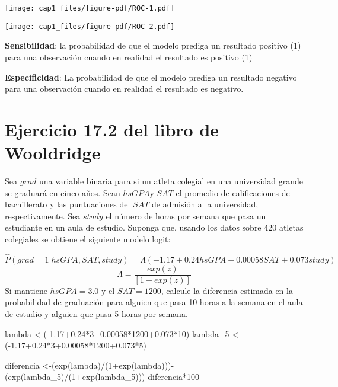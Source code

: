 \documentclass[
  letterpaper,
  DIV=11,
  numbers=noendperiod]{scrreprt}
\newenvironment{Shaded}{\begin{snugshade}}{\end{snugshade}}
\newcommand{\DecValTok}[1]{\textcolor[rgb]{0.68,0.00,0.00}{#1}}
\newcommand{\FloatTok}[1]{\textcolor[rgb]{0.68,0.00,0.00}{#1}}
\newcommand{\FunctionTok}[1]{\textcolor[rgb]{0.28,0.35,0.67}{#1}}
\newcommand{\NormalTok}[1]{\textcolor[rgb]{0.00,0.23,0.31}{#1}}
\newcommand{\OtherTok}[1]{\textcolor[rgb]{0.00,0.23,0.31}{#1}}
\newcommand{\SpecialCharTok}[1]{\textcolor[rgb]{0.37,0.37,0.37}{#1}}
\begin{document}
\texttt{[image: cap1\_files/figure-pdf/ROC-1.pdf]}

\texttt{[image: cap1\_files/figure-pdf/ROC-2.pdf]}

\textbf{Sensibilidad}: la probabilidad de que el modelo prediga un
resultado positivo (1) para una observación cuando en realidad el
resultado es positivo (1)

\textbf{Especificidad}: La probabilidad de que el modelo prediga un
resultado negativo para una observación cuando en realidad el resultado
es negativo.


\chapter{Ejercicio 17.2 del libro de
Wooldridge}\label{ejercicio-17.2-del-libro-de-wooldridge}

Sea \(grad\) una variable binaria para si un atleta colegial en una
universidad grande se graduará en cinco años. Sean \(hsGPA\)y \(SAT\) el
promedio de calificaciones de bachillerato y las puntuaciones del
\(SAT\) de admisión a la universidad, respectivamente. Sea \(study\) el
número de horas por semana que pasa un estudiante en un aula de estudio.
Suponga que, usando los datos sobre 420 atletas colegiales se obtiene el
siguiente modelo logit:

\[
\widehat{P}(grad=1|hsGPA,SAT,study)=\Lambda(-1.17+0.24hsGPA+0.00058SAT+0.073study) 
\] \[
\Lambda =\frac{exp(z)}{[1+exp(z)]}
\] Si mantiene \(hsGPA = 3.0\) y el \(SAT = 1200\), calcule la
diferencia estimada en la probabilidad de graduación para alguien que
pasa 10 horas a la semana en el aula de estudio y alguien que pasa 5
horas por semana.

\begin{Shaded}
\begin{Highlighting}[]
\NormalTok{lambda }\OtherTok{\textless{}{-}}\NormalTok{(}\SpecialCharTok{{-}}\FloatTok{1.17+0.24}\SpecialCharTok{*}\DecValTok{3}\FloatTok{+0.00058}\SpecialCharTok{*}\DecValTok{1200}\FloatTok{+0.073}\SpecialCharTok{*}\DecValTok{10}\NormalTok{)}
\NormalTok{lambda\_5 }\OtherTok{\textless{}{-}}\NormalTok{ (}\SpecialCharTok{{-}}\FloatTok{1.17+0.24}\SpecialCharTok{*}\DecValTok{3}\FloatTok{+0.00058}\SpecialCharTok{*}\DecValTok{1200}\FloatTok{+0.073}\SpecialCharTok{*}\DecValTok{5}\NormalTok{)}

\NormalTok{diferencia }\OtherTok{\textless{}{-}}\NormalTok{(}\FunctionTok{exp}\NormalTok{(lambda)}\SpecialCharTok{/}\NormalTok{(}\DecValTok{1}\SpecialCharTok{+}\FunctionTok{exp}\NormalTok{(lambda)))}\SpecialCharTok{{-}}\NormalTok{(}\FunctionTok{exp}\NormalTok{(lambda\_5)}\SpecialCharTok{/}\NormalTok{(}\DecValTok{1}\SpecialCharTok{+}\FunctionTok{exp}\NormalTok{(lambda\_5)))}
\NormalTok{diferencia}\SpecialCharTok{*}\DecValTok{100}
\end{Highlighting}
\end{Shaded}
\end{document}

